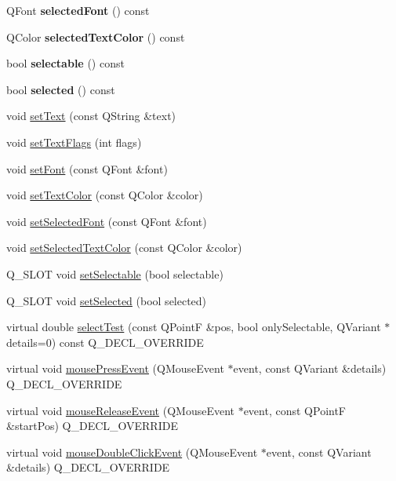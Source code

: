 \begin{DoxyCompactItemize}
Q\+Font {\bfseries selected\+Font} () const
\item 
\mbox{\label{class_q_c_p_text_element_a98616fa5c33f1eaee0428191ece39686}} 
Q\+Color {\bfseries selected\+Text\+Color} () const
\item 
\mbox{\label{class_q_c_p_text_element_a96e2a712fca40324a8489f75833b4096}} 
bool {\bfseries selectable} () const
\item 
\mbox{\label{class_q_c_p_text_element_a135d1ad0aa97a245b4247c3292ff551c}} 
bool {\bfseries selected} () const
\item 
void \mbox{\hyperlink{class_q_c_p_text_element_ac44b81e69e719b879eb2feecb33557e2}{set\+Text}} (const Q\+String \&text)
\item 
void \mbox{\hyperlink{class_q_c_p_text_element_ab908f437f552020888a3ad8cf8242605}{set\+Text\+Flags}} (int flags)
\item 
void \mbox{\hyperlink{class_q_c_p_text_element_a09b3241769528fa87cb4bf35c97defad}{set\+Font}} (const Q\+Font \&font)
\item 
void \mbox{\hyperlink{class_q_c_p_text_element_a4f3b8361c3ffb3f84346954929ce93ba}{set\+Text\+Color}} (const Q\+Color \&color)
\item 
void \mbox{\hyperlink{class_q_c_p_text_element_a0a2397a3c4ede519e16ab3e991904065}{set\+Selected\+Font}} (const Q\+Font \&font)
\item 
void \mbox{\hyperlink{class_q_c_p_text_element_abaec200cae70a0eade53583defc0476d}{set\+Selected\+Text\+Color}} (const Q\+Color \&color)
\item 
Q\+\_\+\+S\+L\+OT void \mbox{\hyperlink{class_q_c_p_text_element_a3c5f9b1897a036b16495ed3fb8371c55}{set\+Selectable}} (bool selectable)
\item 
Q\+\_\+\+S\+L\+OT void \mbox{\hyperlink{class_q_c_p_text_element_aba5521f9fb22a5f3d2f09ab37d4a1751}{set\+Selected}} (bool selected)
\item 
virtual double \mbox{\hyperlink{class_q_c_p_text_element_a1e721bc2994a127ef5a8f0a514a5dbac}{select\+Test}} (const Q\+PointF \&pos, bool only\+Selectable, Q\+Variant $\ast$details=0) const Q\+\_\+\+D\+E\+C\+L\+\_\+\+O\+V\+E\+R\+R\+I\+DE
\item 
virtual void \mbox{\hyperlink{class_q_c_p_text_element_ad7b2c98355e3d2f912574b74fcee0574}{mouse\+Press\+Event}} (Q\+Mouse\+Event $\ast$event, const Q\+Variant \&details) Q\+\_\+\+D\+E\+C\+L\+\_\+\+O\+V\+E\+R\+R\+I\+DE
\item 
virtual void \mbox{\hyperlink{class_q_c_p_text_element_acfcbaf9b1da18745e72726aafb39c855}{mouse\+Release\+Event}} (Q\+Mouse\+Event $\ast$event, const Q\+PointF \&start\+Pos) Q\+\_\+\+D\+E\+C\+L\+\_\+\+O\+V\+E\+R\+R\+I\+DE
\item 
virtual void \mbox{\hyperlink{class_q_c_p_text_element_a2272ff775ab385f612e9fd39773de7c0}{mouse\+Double\+Click\+Event}} (Q\+Mouse\+Event $\ast$event, const Q\+Variant \&details) Q\+\_\+\+D\+E\+C\+L\+\_\+\+O\+V\+E\+R\+R\+I\+DE
\end{DoxyCompactItemize}
